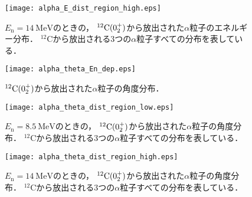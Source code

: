 \documentclass[../master]{subfiles}
\begin{document}
\begin{figure}
  \centering
  \texttt{[image: alpha\_E\_dist\_region\_high.eps]}
  \caption[${}^{12}{\rm C} (0_2^+)$から放出された$\alpha$粒子のエネルギー分布．]
          {$E_{\mathrm{n}}=\SI{14}{\mega\electronvolt}$のときの，
            ${}^{12}{\rm C} (0_2^+)$から放出された$\alpha$粒子のエネルギー分布．
            ${}^{12}\mathrm{C}$から放出される3つの$\alpha$粒子すべての分布を表している．}
          \label{fig::alpha_E_dist_high}
\end{figure}
\begin{figure}
  \centering
  \texttt{[image: alpha\_theta\_En\_dep.eps]}
  \caption{${}^{12}{\rm C} (0_2^+)$から放出された$\alpha$粒子の角度分布．}
  \label{fig::alpha_theta_En_dep}
\end{figure}
\begin{figure}
  \centering
  \texttt{[image: alpha\_theta\_dist\_region\_low.eps]}
  \caption[${}^{12}{\rm C} (0_2^+)l$から放出された$\alpha$粒子の角度分布．]
          {$E_{\mathrm{n}}=\SI{8.5}{\mega\electronvolt}$のときの，
            ${}^{12}{\rm C} (0_2^+)$から放出された$\alpha$粒子の角度分布．
            ${}^{12}\mathrm{C}$から放出される3つの$\alpha$粒子すべての分布を表している．
          }
  \label{fig::alpha_theta_dist_low}
\end{figure}
\begin{figure}
  \centering
  \texttt{[image: alpha\_theta\_dist\_region\_high.eps]}
  \caption[${}^{12}{\rm C} (0_2^+)$から放出された$\alpha$粒子の角度分布．]
          {$E_{\mathrm{n}}=\SI{14}{\mega\electronvolt}$のときの，
            ${}^{12}{\rm C} (0_2^+)$から放出された$\alpha$粒子の角度分布．
            ${}^{12}\mathrm{C}$から放出される3つの$\alpha$粒子すべての分布を表している．
          }
  \label{fig::alpha_theta_dist_high}
\end{figure}

\end{document}
